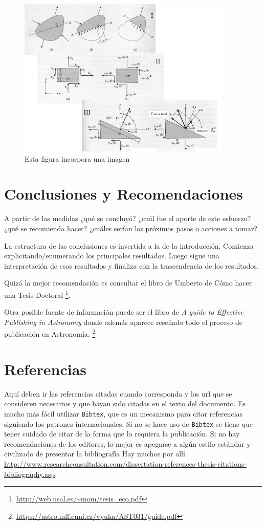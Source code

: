\documentclass[spanish,notitlepage,letterpaper,11pt]{article} %
\begin{document}
\begin{figure}
\begin{center}
\includegraphics[width=4in]{FigModeloReporte/FigTensorEsfuerzos2D.jpg}
\caption{Esta figura incorpora una imagen}
\label{Figura1}
\end{center}
\end{figure}


\section{Conclusiones y Recomendaciones}
A partir de las medidas ¿qué se concluyó? ¿cuál fue el aporte de este esfuerzo? ¿qué se recomienda hacer? ¿cuáles serían los próximos pasos o acciones a tomar? 

La estructura de las conclusiones es invertida a la de la introducción. Comienza explicitando/enumerando los principales resultados. Luego sigue una interpretación de esos resultados y finaliza con la trascendencia de los resultados.  

Quizá la mejor recomendación es consultar el libro de Umberto de Cómo hacer una Tesis Doctoral\cite{Eco1986} \footnote{\url{http://web.usal.es/~mom/tesis_eco.pdf}}. 

Otra posible fuente de información puede ser el libro de \textit{A guide to Effective Publishing in Astronomy} \cite{BertoutBiemesderferHenri2012} donde además aparece reseñado todo el proceso de publicación en Astronomía. 
\footnote{\url{https://astro.mff.cuni.cz/vyuka/AST031/guide.pdf}}


\section{Referencias}
Aquí deben ir las referencias citadas \cite{Narasimhan1993} cuando corresponda y los url que se consideren necesarios y que hayan sido citadas en el texto del documento. Es mucho más fácil utilizar \texttt{Bibtex}, que es un mecanismo para citar referencias siguiendo los patrones internacionales. Si no se hace uso de \texttt{Bibtex} se tiene que tener cuidado de citar de la forma que lo requiera la publicación. Si no hay recomendaciones de los editores, lo mejor es apegarse a algún estilo estándar y civilizado de presentar la bibliografía Hay muchos por allí \url{http://www.researchconsultation.com/dissertation-references-thesis-citations-bibliography.asp}. 
\end{document}
